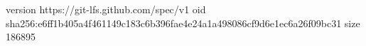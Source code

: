 version https://git-lfs.github.com/spec/v1
oid sha256:e6ff1b405a4f461149c183c6b396fae4e24a1a498086cf9d6e1ec6a26f09bc31
size 186895
